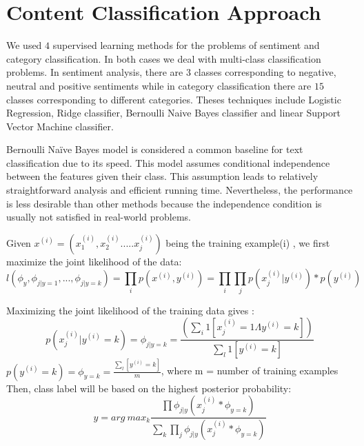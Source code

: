 \section{Content Classification Approach}
\label{sec:approach}
We used $4$ supervised learning methods for the problems of sentiment and category classification.
In both cases we deal with multi-class classification problems. In sentiment analysis, there are $3$ classes corresponding to negative, neutral and positive sentiments while in category classification there are $15$ classes corresponding to different categories.
Theses techniques include Logistic Regression, Ridge classifier, Bernoulli Naive Bayes classifier and linear Support Vector Machine classifier.

Bernoulli Naïve Bayes model is considered a common baseline for text classification due to its speed.
This model assumes conditional independence between the features given their class. This assumption leads to relatively straightforward analysis and efficient running time. Nevertheless, the performance is less desirable than other methods because the independence condition is usually not satisfied in real-world problems.


Given $x^{(i)}=(x_1^{(i)},x_2^{(i)}.....x_j^{(i)})$ being the training example(i) , we first maximize the joint likelihood of the data:
$$l(\phi_y,\phi_{j|y=1},...,\phi_{j|y=k})=\prod_i p(x^{(i)},y^{(i)}) = \prod_i \prod_j p(x_j^{(i)}|y^{(i)}) * p(y^{(i)})$$


Maximizing the joint likelihood of the training data gives :
$$p(x_j^{(i)}|y^{(i)}=k)=\phi_{j|y=k}=\frac{(\sum_i 1 [x_j^{(i)}=1 \Lambda y^{(i)}=k])}{\sum_l1[y^{(i)}=k]}$$
$p(y^{(i)}=k)=\phi_{y=k}=\frac{\sum_l [y^{(i)}=k]}{m} $, where m = number of training examples
Then, class label will be based on the highest posterior probability:
\begin{equation}
y = arg\: max_k \frac{\prod \phi_{j|y}(x_j^{(i)}*\phi_{y=k})}{\sum_k \prod_j \phi_{j|y}(x_j^{(i)}*\phi_{y=k})}
\end{equation}
%
%

